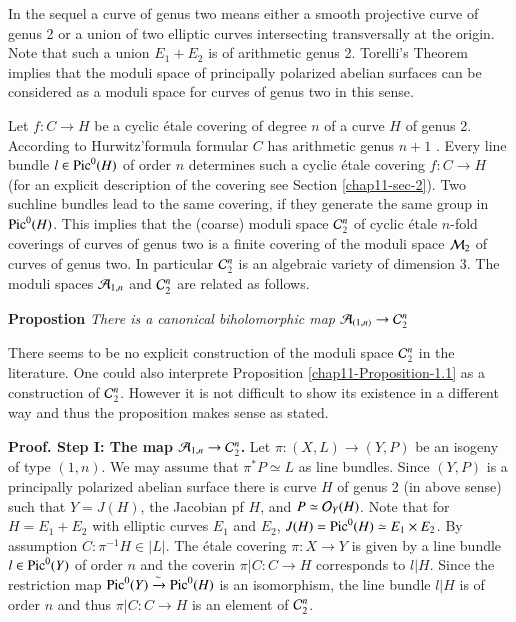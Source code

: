 In the sequel a curve of genus two means either a smooth projective curve of genus 2 or a union of two elliptic curves intersecting transversally at the origin. Note that such a union $E_{1}+ E_{2}$ is of arithmetic genus 2. Torelli's Theorem implies that the moduli space of principally polarized abelian surfaces can be considered as a moduli space for curves of genus two in this sense.

Let $f: C\rightarrow H$ be a cyclic \'etale covering of degree $n$ of a curve $H$ of genus 2. According to Hurwitz'formula formular $C$ has arithmetic genus $n+1$ . Every line bundle $l \in \operatorname{Pic}^{0}(H)$ of order $n$ determines such a cyclic \'etale covering $f: C\rightarrow H$ (for an explicit description of the  covering see Section \ref{chap11-sec-2}). Two such\pageoriginale line bundles lead to the same covering, if they generate the same group in $\operatorname{Pic}^{0}(H)$. This implies that the (coarse) moduli space $\mathcal{C}_{2}^{n}$ of cyclic \'etale $n$-fold coverings of curves of genus two is a finite covering of the moduli space $\mathcal{M}_{2}$ of curves of genus two. In particular $\mathcal{C}_{2}^{n}$ is an algebraic variety of dimension 3. The moduli spaces $\mathcal{A}_{1,n}$ and $\mathcal{C}_{2}^{n}$ are related as follows.

\medskip
\noindent
{\bfseries {} Propostion\label{chap11-Proposition-1.1}} \textit{There is a canonical biholomorphic map} $\mathcal{A}_{(1,n)} \rightarrow \mathcal{C}_{2}^{n}$

\smallskip
There seems to be no explicit construction of the moduli space $\mathcal{C}_{2}^{n}$ in the literature. One could also interprete Proposition \ref{chap11-Proposition-1.1} as a construction of $\mathcal{C}_{2}^{n}$. However it is not difficult to show its existence in a different way and thus the proposition makes sense as stated.

\medskip
\noindent
{\bfseries Proof. Step I: The map $\mathcal{A}_{1,n}\rightarrow \mathcal{C}_{2}^{n}$.} Let $\pi : (X, L)\rightarrow (Y,P)$ be an isogeny of type $(1,n)$. We may assume that $\pi^{*} P\simeq L$ as line bundles. Since $(Y, P)$ is a principally polarized abelian surface there is curve $H$ of genus 2 (in above sense) such that $Y=J(H)$, the Jacobian pf $H$, and $P\simeq\mathcal{O}_{Y}(H)$. Note that for $H=E_{1} + E_{2}$ with elliptic curves $E_{1}$ and $E_{2}$, $J(H) = \operatorname{Pic}^{0}(H) \simeq E_{1}\times E_{2}$. By assumption $C : \pi^{-1}H \in |L|$. The \'etale covering $\pi : X \rightarrow Y$ is given by a line bundle $l \in \operatorname{Pic}^{0}(Y)$ of order $n$ and the coverin $\pi |C:C \rightarrow H$ corresponds to $l|H$. Since the restriction map $\operatorname{Pic}^{0}(Y) \xrightarrow{\sim} \operatorname{Pic}^{0}(H)$ is an isomorphism, the line bundle $l|H$ is of order $n$ and thus $\pi|C:C \rightarrow H$ is an element of $\mathcal{C}_{2}^{n}$.

